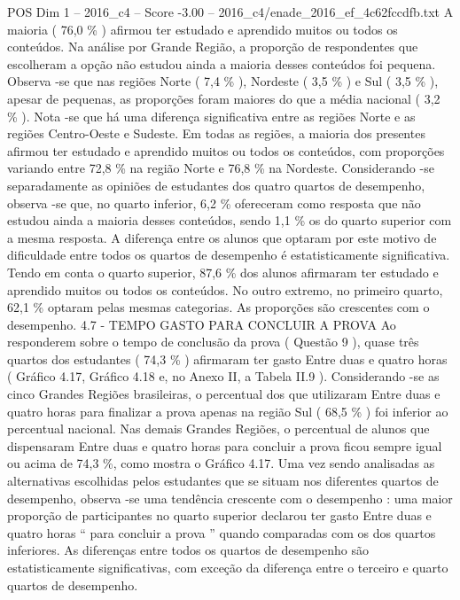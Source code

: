 \begin{textsample}{POS Dim 1 – 2016\_c4 – Score -3.00 – 2016\_c4/enade\_2016\_ef\_4c62fccdfb.txt}
A maioria ( 76,0 \% ) afirmou ter estudado e aprendido muitos ou todos os conteúdos.
Na análise por Grande Região, a proporção de respondentes que escolheram a opção não estudou ainda a maioria desses conteúdos foi pequena.
Observa -se que nas regiões Norte ( 7,4 \% ), Nordeste ( 3,5 \% ) e Sul ( 3,5 \% ), apesar de pequenas, as proporções foram maiores do que a média nacional ( 3,2 \% ).
Nota -se que há uma diferença significativa entre as regiões Norte e as regiões Centro-Oeste e Sudeste.
Em todas as regiões, a maioria dos presentes afirmou ter estudado e aprendido muitos ou todos os conteúdos, com proporções variando entre 72,8 \% na região Norte e 76,8 \% na Nordeste.
Considerando -se separadamente as opiniões de estudantes dos quatro quartos de desempenho, observa -se que, no quarto inferior, 6,2 \% ofereceram como resposta que não estudou ainda a maioria desses conteúdos, sendo 1,1 \% os do quarto superior com a mesma resposta.
A diferença entre os alunos que optaram por este motivo de dificuldade entre todos os quartos de desempenho é estatisticamente significativa.
Tendo em conta o quarto superior, 87,6 \% dos alunos afirmaram ter estudado e aprendido muitos ou todos os conteúdos.
No outro extremo, no primeiro quarto, 62,1 \% optaram pelas mesmas categorias.
As proporções são crescentes com o desempenho. 4.7 - TEMPO GASTO PARA CONCLUIR A PROVA Ao responderem sobre o tempo de conclusão da prova ( Questão 9 ), quase três quartos dos estudantes ( 74,3 \% ) afirmaram ter gasto Entre duas e quatro horas ( Gráfico 4.17, Gráfico 4.18 e, no Anexo II, a Tabela II.9 ).
Considerando -se as cinco Grandes Regiões brasileiras, o percentual dos que utilizaram Entre duas e quatro horas para finalizar a prova apenas na região Sul ( 68,5 \% ) foi inferior ao percentual nacional.
Nas demais Grandes Regiões, o percentual de alunos que dispensaram Entre duas e quatro horas para concluir a prova ficou sempre igual ou acima de 74,3 \%, como mostra o Gráfico 4.17.
Uma vez sendo analisadas as alternativas escolhidas pelos estudantes que se situam nos diferentes quartos de desempenho, observa -se uma tendência crescente com o desempenho : uma maior proporção de participantes no quarto superior declarou ter gasto Entre duas e quatro horas “ para concluir a prova ” quando comparadas com os dos quartos inferiores.
As diferenças entre todos os quartos de desempenho são estatisticamente significativas, com exceção da diferença entre o terceiro e quarto quartos de desempenho.

\end{textsample}
